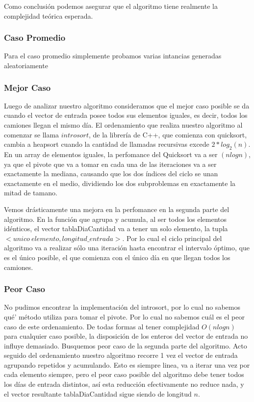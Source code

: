 Como conclusi\'on podemos asegurar que el algoritmo tiene realmente la complejidad te\'orica esperada.


\subsubsection{Caso Promedio}

Para el caso promedio simplemente probamos varias intancias generadas aleatoriamente

\subsubsection{Mejor Caso}

Luego de analizar nuestro algoritmo consideramos que el mejor caso posible se da cuando el vector de entrada posee todos sus elementos iguales, es decir, todos los camiones llegan el mismo d\'ia. El ordenamiento que realiza nuestro algoritmo al comenzar se llama $introsort$, de la librer\'ia de C++, que comienza con quicksort, cambia a heapsort cuando la cantidad de llamadas recursivas excede $2*log_2(n)$. En un array de elementos iguales, la perfomance del Quicksort va a ser $(n log n)$, ya que el pivote que va a tomar en cada una de las iteraciones va a ser exactamente la mediana, causando que los dos \'indices del ciclo se unan exactamente en el medio, dividiendo los dos subproblemas en exactamente la mitad de tamano.

\vspace{2mm}

Vemos dr\'asticamente una mejora en la perfomance en la segunda parte del algoritmo. En la funci\'on que agrupa y acumula, al ser todos los elementos id\'enticos, el vector tablaDiaCantidad va a tener un solo elemento, la tupla $<unico \: elemento, longitud\_entrada>$. Por lo cual el ciclo principal del algoritmo va a realizar s\'olo una iteraci\'on hasta encontrar el intervalo \'optimo, que es el \'unico posible, el que comienza con el \'unico d\'ia en que llegan todos los camiones.

\subsubsection{Peor Caso}

No pudimos encontrar la implementaci\'on del introsort, por lo cual no sabemos qu\'e' m\'etodo utiliza para tomar el pivote. Por lo cual no sabemos cu\'al es el peor caso de este ordenamiento. De todas formas al tener complejidad $O(nlogn)$ para cualquier caso posible, la disposici\'on de los enteros del vector de entrada no influye demasiado. Busquemos peor caso de la segunda parte del algoritmo. Acto seguido del ordenamiento nuestro algoritmo recorre 1 vez el vector de entrada agrupando repetidos y acumulando. Esto es siempre linea, va a iterar una vez por cada elemento siempre, pero el peor caso posible del algoritmo debe tener todos los d\'ias de entrada distintos, as\'i esta reducci\'on efectivamente no reduce nada, y el vector resultante tablaDiaCantidad sigue siendo de longitud $n$.



